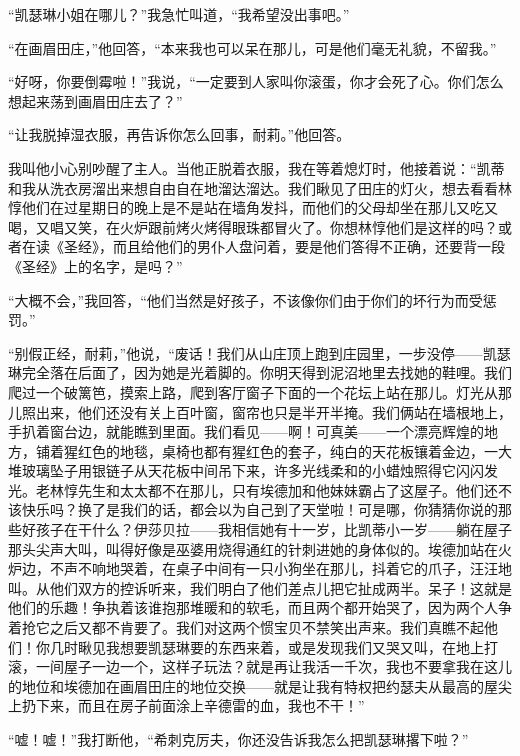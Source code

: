 \par “凯瑟琳小姐在哪儿？”我急忙叫道，“我希望没出事吧。”
\par “在画眉田庄，”他回答，“本来我也可以呆在那儿，可是他们毫无礼貌，不留我。”
\par “好呀，你要倒霉啦！”我说，“一定要到人家叫你滚蛋，你才会死了心。你们怎么想起来荡到画眉田庄去了？”
\par “让我脱掉湿衣服，再告诉你怎么回事，耐莉。”他回答。
\par 我叫他小心别吵醒了主人。当他正脱着衣服，我在等着熄灯时，他接着说：“凯蒂和我从洗衣房溜出来想自由自在地溜达溜达。我们瞅见了田庄的灯火，想去看看林惇他们在过星期日的晚上是不是站在墙角发抖，而他们的父母却坐在那儿又吃又喝，又唱又笑，在火炉跟前烤火烤得眼珠都冒火了。你想林惇他们是这样的吗？或者在读《圣经》，而且给他们的男仆人盘问着，要是他们答得不正确，还要背一段《圣经》上的名字，是吗？”
\par “大概不会，”我回答，“他们当然是好孩子，不该像你们由于你们的坏行为而受惩罚。”
\par “别假正经，耐莉，”他说，“废话！我们从山庄顶上跑到庄园里，一步没停——凯瑟琳完全落在后面了，因为她是光着脚的。你明天得到泥沼地里去找她的鞋哩。我们爬过一个破篱笆，摸索上路，爬到客厅窗子下面的一个花坛上站在那儿。灯光从那儿照出来，他们还没有关上百叶窗，窗帘也只是半开半掩。我们俩站在墙根地上，手扒着窗台边，就能瞧到里面。我们看见——啊！可真美——一个漂亮辉煌的地方，铺着猩红色的地毯，桌椅也都有猩红色的套子，纯白的天花板镶着金边，一大堆玻璃坠子用银链子从天花板中间吊下来，许多光线柔和的小蜡烛照得它闪闪发光。老林惇先生和太太都不在那儿，只有埃德加和他妹妹霸占了这屋子。他们还不该快乐吗？换了是我们的话，都会以为自己到了天堂啦！可是哪，你猜猜你说的那些好孩子在干什么？伊莎贝拉——我相信她有十一岁，比凯蒂小一岁——躺在屋子那头尖声大叫，叫得好像是巫婆用烧得通红的针刺进她的身体似的。埃德加站在火炉边，不声不响地哭着，在桌子中间有一只小狗坐在那儿，抖着它的爪子，汪汪地叫。从他们双方的控诉听来，我们明白了他们差点儿把它扯成两半。呆子！这就是他们的乐趣！争执着该谁抱那堆暖和的软毛，而且两个都开始哭了，因为两个人争着抢它之后又都不肯要了。我们对这两个惯宝贝不禁笑出声来。我们真瞧不起他们！你几时瞅见我想要凯瑟琳要的东西来着，或是发现我们又哭又叫，在地上打滚，一间屋子一边一个，这样子玩法？就是再让我活一千次，我也不要拿我在这儿的地位和埃德加在画眉田庄的地位交换——就是让我有特权把约瑟夫从最高的屋尖上扔下来，而且在房子前面涂上辛德雷的血，我也不干！”
\par “嘘！嘘！”我打断他，“希刺克厉夫，你还没告诉我怎么把凯瑟琳撂下啦？”
